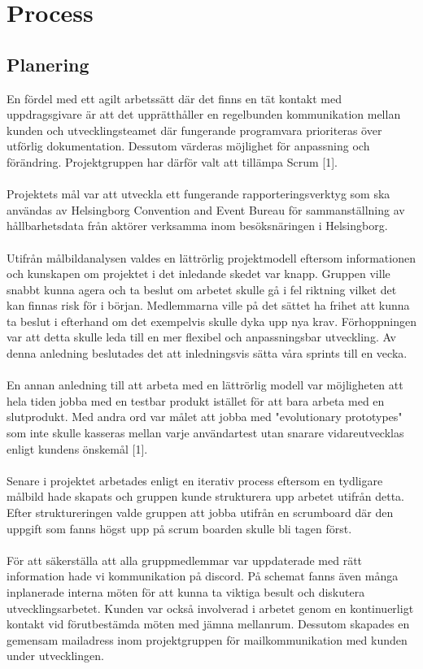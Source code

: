 \documentclass[12pt]{article}
\begin{document}
\section{Process}

\subsection{Planering}
En fördel med ett agilt arbetssätt där det finns en tät kontakt med uppdragsgivare är att det upprätthåller en regelbunden kommunikation mellan kunden och utvecklingsteamet där fungerande programvara prioriteras över utförlig dokumentation. Dessutom värderas möjlighet för anpassning och förändring. Projektgruppen har därför valt att tillämpa Scrum [1].  \\\\
Projektets mål var att utveckla ett fungerande rapporteringsverktyg som ska användas av Helsingborg Convention and Event Bureau för sammanställning av \\ hållbarhetsdata från aktörer verksamma inom besöksnäringen i Helsingborg. \\\\
Utifrån målbildanalysen valdes en lättrörlig projektmodell eftersom informationen och kunskapen om projektet i det inledande skedet var knapp. Gruppen ville snabbt kunna agera och ta beslut om arbetet skulle gå i fel riktning vilket det kan finnas risk för i början. Medlemmarna ville på det sättet ha frihet att kunna ta beslut i efterhand om det exempelvis skulle dyka upp nya krav. Förhoppningen var att detta skulle leda till en mer flexibel och anpassningsbar utveckling. Av denna anledning beslutades det att inledningsvis sätta våra sprints till en vecka. \\\\ 
En annan anledning till att arbeta med en lättrörlig modell var möjligheten att hela tiden jobba med en testbar produkt istället för att bara arbeta med en slutprodukt. Med andra ord var målet att jobba med "evolutionary prototypes" som inte skulle kasseras mellan varje användartest utan snarare vidareutvecklas enligt kundens önskemål [1].\\\\
Senare i projektet arbetades enligt en iterativ process eftersom en tydligare målbild hade skapats och gruppen kunde strukturera upp arbetet utifrån detta. Efter struktureringen valde gruppen att jobba utifrån en scrumboard där den uppgift som fanns högst upp på scrum boarden skulle bli tagen först. \\\\
För att säkerställa att alla gruppmedlemmar var uppdaterade med rätt information hade vi kommunikation på discord. På schemat fanns även många inplanerade interna möten för att kunna ta viktiga besult och diskutera utvecklingsarbetet. Kunden var också involverad i arbetet genom en kontinuerligt kontakt vid förutbestämda möten med jämna mellanrum. Dessutom skapades en gemensam mailadress inom projektgruppen för mailkommunikation med kunden under utvecklingen.
\end{document}
